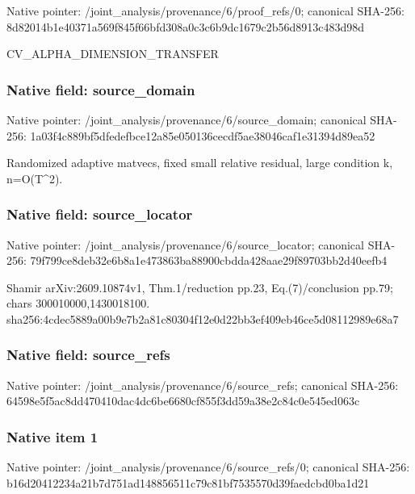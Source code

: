\documentclass[10pt,a4paper]{article}
\begin{document}
Native pointer: /joint\_analysis/provenan\allowbreak{}ce/6/proof\_refs/0; canonical SHA-256: 8d82014b1e40371a569f845f\allowbreak{}66bfd308a0c3c6b9dc1679c2\allowbreak{}b56d8913c483d98d


CV\_ALPHA\_DIMENSION\_TRANSFER


\subsubsection{Native field: source\_domain}


Native pointer: /joint\_analysis/provenan\allowbreak{}ce/6/source\_domain; canonical SHA-256: 1a03f4c889bf5dfedefbce12\allowbreak{}a85e050136cecdf5ae38046c\allowbreak{}af1e31394d89ea52


Randomized adaptive matvecs, fixed small relative residual, large condition k, n=O(T\textasciicircum{}2).


\subsubsection{Native field: source\_locator}


Native pointer: /joint\_analysis/provenan\allowbreak{}ce/6/source\_locator; canonical SHA-256: 79f799ce8deb32e6b8a1e473\allowbreak{}863ba88900cbdda428aae29f\allowbreak{}89703bb2d40eefb4


Shamir arXiv:2609.10874v1, Thm.1/reduction pp.23, Eq.(7)/conclusion pp.79; chars 300010000,1430018100. sha256:4cdec5889a00b9e7b\allowbreak{}2a81c80304f12e0d22bb3ef4\allowbreak{}09eb46ce5d08112989e68a7


\subsubsection{Native field: source\_refs}


Native pointer: /joint\_analysis/provenan\allowbreak{}ce/6/source\_refs; canonical SHA-256: 64598e5f5ac8dd470410dac4\allowbreak{}dc6be6680cf855f3dd59a38e\allowbreak{}2c84c0e545ed063c



\subsubsection{Native item 1}


Native pointer: /joint\_analysis/provenan\allowbreak{}ce/6/source\_refs/0; canonical SHA-256: b16d20412234a21b7d751ad1\allowbreak{}48856511c79c81bf7535570d\allowbreak{}39faedcbd0ba1d21
\end{document}
